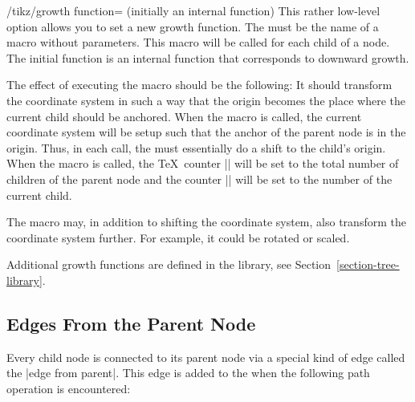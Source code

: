 \begin{key}{/tikz/growth function= (initially
    \normalfont an internal function)}
  This rather low-level option allows you to set a new growth
  function. The  must be the name of a macro without
  parameters. This macro will be called for each child of a node. The
  initial function is an internal function that corresponds to
  downward growth.

  The effect of executing the macro should be the following: It should
  transform the coordinate system in such a way that the origin
  becomes the place where the current child should be anchored. When
  the macro is called, the current coordinate system will be setup
  such that the anchor of the parent node is in the origin. Thus, in
  each call, the  must essentially do a shift to the
  child's origin. When the macro is called, the \TeX\ counter
  |\tikznumberofchildren| will be set to the total number of children
  of the parent node and the counter |\tikznumberofcurrentchild| will
  be set to the number of the current child.

  The macro may, in addition to shifting the coordinate system, also
  transform the coordinate system further. For example, it could be
  rotated or scaled.

  Additional growth functions are defined in the library, see 
  Section~\ref{section-tree-library}.
\end{key}



\subsection{Edges From the Parent Node}

\label{section-edge-from-parent}

Every child node is connected to its parent node via a special kind of
edge called the |edge from parent|. This edge is added to the
 when the following path operation is encountered:

